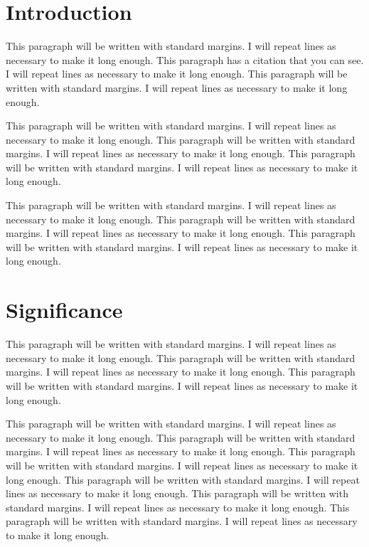 \documentclass[numbib]{buthesis_p}  %
\begin{document}
\author{A. Student}
\maketitle

\section{Introduction}
This paragraph will be written with standard margins. I will repeat
lines as necessary to make it long enough. This paragraph has a 
citation \citep{SMI04} that you can see.
I will repeat lines as necessary to
make it long enough. This paragraph will be written with standard
margins. I will repeat lines as necessary to make it long enough.

This paragraph will be written with standard margins. I will repeat
lines as necessary to make it long enough. This paragraph 
will be written with standard margins. I will repeat lines as necessary to
make it long enough. This paragraph will be written with standard
margins. I will repeat lines as necessary to make it long enough.

This paragraph will be written with standard margins. I will repeat
lines as necessary to make it long enough. This paragraph
will be written with standard margins. I will repeat lines as necessary to
make it long enough. This paragraph will be written with standard
margins. I will repeat lines as necessary to make it long enough.


\section{Significance}
This paragraph will be written with standard margins. I will repeat
lines as necessary to make it long enough. This paragraph will be
written with standard margins. I will repeat lines as necessary to
make it long enough. This paragraph will be written with standard
margins. I will repeat lines as necessary to make it long enough.

This paragraph will be written with standard margins. I will repeat
lines as necessary to make it long enough. This paragraph will be
written with standard margins. I will repeat lines as necessary to
make it long enough. This paragraph will be written with standard
margins. I will repeat lines as necessary to make it long enough.
This paragraph will be written with standard margins. I will repeat
lines as necessary to make it long enough. This paragraph will be
written with standard margins. I will repeat lines as necessary to
make it long enough. This paragraph will be written with standard
margins. I will repeat lines as necessary to make it long enough.
\end{document}
